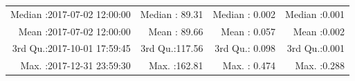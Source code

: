 \documentclass[
  10pt,
  a4paper,oneside]{article}
\begin{document}
\begin{longtable}[]{@{}rrrr@{}}
\begin{minipage}[t]{0.33\columnwidth}
Median :2017-07-02 12:00:00\strut
\end{minipage} & \begin{minipage}[t]{0.19\columnwidth}\raggedleft
Median : 89.31\strut
\end{minipage} & \begin{minipage}[t]{0.19\columnwidth}\raggedleft
Median : 0.002\strut
\end{minipage} & \begin{minipage}[t]{0.19\columnwidth}\raggedleft
Median :0.001\strut
\end{minipage}\tabularnewline
\begin{minipage}[t]{0.33\columnwidth}\raggedleft
Mean :2017-07-02 12:00:00\strut
\end{minipage} & \begin{minipage}[t]{0.19\columnwidth}\raggedleft
Mean : 89.66\strut
\end{minipage} & \begin{minipage}[t]{0.19\columnwidth}\raggedleft
Mean : 0.057\strut
\end{minipage} & \begin{minipage}[t]{0.19\columnwidth}\raggedleft
Mean :0.002\strut
\end{minipage}\tabularnewline
\begin{minipage}[t]{0.33\columnwidth}\raggedleft
3rd Qu.:2017-10-01 17:59:45\strut
\end{minipage} & \begin{minipage}[t]{0.19\columnwidth}\raggedleft
3rd Qu.:117.56\strut
\end{minipage} & \begin{minipage}[t]{0.19\columnwidth}\raggedleft
3rd Qu.: 0.098\strut
\end{minipage} & \begin{minipage}[t]{0.19\columnwidth}\raggedleft
3rd Qu.:0.001\strut
\end{minipage}\tabularnewline
\begin{minipage}[t]{0.33\columnwidth}\raggedleft
Max. :2017-12-31 23:59:30\strut
\end{minipage} & \begin{minipage}[t]{0.19\columnwidth}\raggedleft
Max. :162.81\strut
\end{minipage} & \begin{minipage}[t]{0.19\columnwidth}\raggedleft
Max. : 0.474\strut
\end{minipage} & \begin{minipage}[t]{0.19\columnwidth}\raggedleft
Max. :0.288\strut
\end{minipage}\tabularnewline

\end{longtable}
\end{document}
